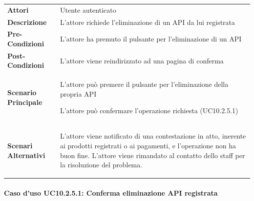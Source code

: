 \begin{minipage}{\linewidth}
	\begin{tabular}{ l | p{11cm}}
		\hline
		\rowcolor{Gray}
		\multicolumn{2}{c}{UC10.2.5 - Eliminazione API registrata} \\
		\hline
		\textbf{Attori} & Utente autenticato \\
		\textbf{Descrizione} & L'attore richiede l'eliminazione di un API da lui registrata\\
		\textbf{Pre-Condizioni} & L'attore ha premuto il pulsante per l'eliminazione di un API\\
		\textbf{Post-Condizioni} & L'attore viene reindirizzato ad una pagina di conferma\\
		\textbf{Scenario Principale} & 
		\begin{enumerate*}[label=(\arabic*.),itemjoin={\newline}]
			\item L'attore può premere il pulsante per l'eliminazione della propria API
			\item L'attore può confermare l'operazione richiesta (UC10.2.5.1)
		\end{enumerate*}\\
		\textbf{Scenari Alternativi} & 
		\begin{enumerate*}[label=(\arabic*.),itemjoin={\newline}]
			\item L'attore viene notificato di una contestazione in atto, inerente ai prodotti registrati o ai pagamenti, e l'operazione non ha buon fine. L'attore viene rimandato al contatto dello staff per la risoluzione del problema.
		\end{enumerate*}\\
	\end{tabular}
\end{minipage}

\paragraph{Caso d'uso UC10.2.5.1: Conferma eliminazione API registrata}
\label{UC10_2_5_1}

